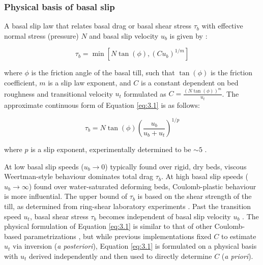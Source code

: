 \subsubsection{Physical basis of basal slip}

A basal slip law that relates basal drag or basal shear stress $\tau_b$ with effective normal stress (pressure) $N$ and basal slip velocity $u_b$ is given by \citet[][eq.1]{Zoetsliplawglaciers2020}:

\begin{equation}
  \tau_b = \min [ N \tan(\phi), (C u_b)^{1/m} ] \label{eq:3.1}
\end{equation}

where $\phi$ is the friction angle of the basal till, such that $\tan(\phi)$ is the friction coefficient, $m$ is a slip law exponent, and $C$ is a constant dependent on bed roughness and transitional velocity $u_t$ formulated as $C = \frac{(N \tan(\phi))^{m}}{u_t}$.
The approximate continuous form of Equation \eqref{eq:3.1} \citep[][eq.3]{Zoetsliplawglaciers2020} is as follows:

\begin{equation}
  \tau_b = N \tan(\phi) \left( \frac{u_b}{u_b + u_t} \right)^{1/p} \label{eq:3.2}
\end{equation}

where $p$ is a slip exponent, experimentally determined to be $\sim5$ \citep{Zoetsliplawglaciers2020}.

At low basal slip speeds ($u_b \to 0$) typically found over rigid, dry beds, viscous Weertman-style behaviour \citep[$(C u_b)^{1/m}$ in Eq.~\ref{eq:3.1},][]{WeertmanSlidingGlaciers1957} dominates total drag $\tau_b$.
At high basal slip speeds ($u_b \to \infty$) found over water-saturated deforming beds, Coulomb-plastic behaviour \citep[$N \tan(\phi)$ in Eq.~\ref{eq:3.1}, e.g.][]{Schoofeffectcavitationglacier2005,JoughinRegularizedCoulombFriction2019} is more influential.
The upper bound of $\tau_b$ is based on the shear strength of the till, as determined from ring-shear laboratory experiments \citep{Zoetsliplawglaciers2020}.
Past the transition speed $u_t$, basal shear stress $\tau_b$ becomes independent of basal slip velocity $u_b$ \citep[c.f.][]{StearnsFrictionbeddoes2018}.
The physical formulation of Equation \eqref{eq:3.1} is similar to that of other Coulomb-based parametrizations \citep[e.g.][]{TsaiMarineicesheetprofiles2015,JoughinRegularizedCoulombFriction2019}, but while previous implementations fixed $C$ to estimate $u_t$ via inversion (\textit{a posteriori}), Equation \eqref{eq:3.1} is formulated on a physical basis with $u_t$ derived independently \citep[using clast size and till placement, see eq.2 in][]{Zoetsliplawglaciers2020} and then used to directly determine $C$ (\textit{a priori}).


